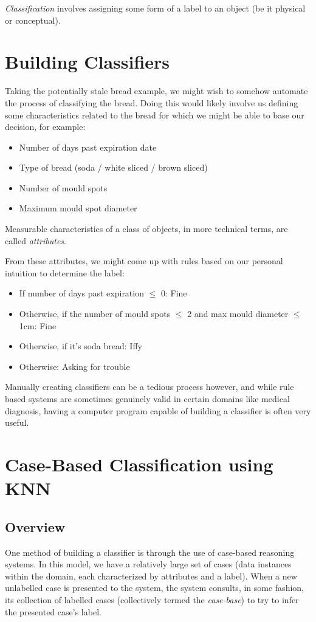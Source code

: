 \documentclass[a4paper,11pt]{report}
\begin{document}
\emph{Classification} involves assigning some form of a label to an object (be it physical or conceptual).

\section{Building Classifiers}
Taking the potentially stale bread example, we might wish to somehow automate the process of classifying the bread. Doing this would likely involve us defining some characteristics related to the bread for which we might be able to base our decision, for example:

\begin{itemize}
	\item Number of days past expiration date
	\item Type of bread (soda / white sliced / brown sliced)
	\item Number of mould spots
	\item Maximum mould spot diameter
\end{itemize}

 Measurable characteristics of a class of objects, in more technical terms, are called \emph{attributes}.
 
 From these attributes, we might come up with rules based on our personal intuition to determine the label:
 
 \begin{itemize}
 	\item If number of days past expiration $\le$ 0: Fine
 	\item Otherwise, if the number of mould spots $\le$ 2 and max mould diameter $\le$ 1cm: Fine
 	\item Otherwise, if it's soda bread: Iffy
 	\item Otherwise: Asking for trouble
 \end{itemize}
 
Manually creating classifiers can be a tedious process however, and while rule based systems are sometimes genuinely valid in certain domains like medical diagnosis, having a computer program capable of building a classifier is often very useful. 

\section{Case-Based Classification using KNN}
\subsection{Overview}
One method of building a classifier is through the use of case-based reasoning systems. In this model, we have a relatively large set of cases (data instances within the domain, each characterized by attributes and a label). When a new unlabelled case is presented to the system, the system consults, in some fashion, its collection of labelled cases (collectively termed the \emph{case-base}) to try to infer the presented case's label.
\end{document}
